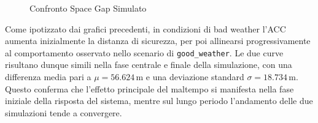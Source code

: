 \begin{figure}[H]
    \centering
    \caption{Confronto Space Gap Simulato}
    \label{fig:space_gap_bw}
\end{figure}
\noindent Come ipotizzato dai grafici precedenti,
in condizioni di bad weather l'ACC aumenta inizialmente la distanza di sicurezza, per poi allinearsi progressivamente 
al comportamento osservato nello scenario di \texttt{good\_weather}. Le due curve risultano dunque simili nella fase centrale e 
finale della simulazione, con una differenza media pari a \(\mu = 56.624 \, \mathrm{m}\) e una deviazione 
standard \(\sigma = 18.734 \, \mathrm{m}\). Questo conferma che l'effetto principale del maltempo si manifesta 
nella fase iniziale della risposta del sistema, mentre sul lungo periodo l'andamento delle due simulazioni tende a convergere.